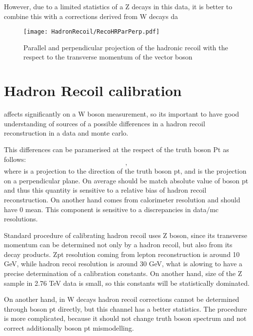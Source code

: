 However, due to a limited statistics of a Z decays in this data, it is better to combine this with a corrections derived from W decays da

\begin{figure}[t]
\begin{center}
\texttt{[image: HadronRecoil/RecoHRParPerp.pdf]}
\caption{Parallel and perpendicular projection of the hadronic recoil with the respect to the transverse momentum of the vector boson \label{ris:HadrRecoilTruthPt}}
\end{center}
\end{figure}

\section{Hadron Recoil calibration}
\etmiss affects significantly on a W boson measurement, so its important to have good understanding of sources of a possible differences in a hadron recoil reconstruction in a data and monte carlo. 

This differences can be paramerised at the respect of the truth boson Pt as follows:
\begin{equation}
,
\end{equation}
where \upar is a projection to the direction of the truth boson pt, and \uperp is the projection on a perpendicular plane. On average \upar should be match absolute value of boson pt and thus this quantity is sensitive to a relative bias of hadron recoil reconstruction. On another hand \uperp comes from calorimeter resolution and should have 0 mean. This component is sensitive to a discrepancies in data/mc resolutions.
 
Standard procedure of calibrating hadron recoil uses Z boson, since its transverse momentum can be determined not only by a hadron recoil, but also from its decay products.  Zpt resolution coming from lepton reconstruction is around 10 GeV, while hadron recoi resolution is around 30 GeV, what is alowing to have a precise determination of a calibration constants. On another hand, size of the Z sample in 2.76 TeV data is small, so this constants will be statistically dominated.

On another hand, in W decays hadron recoil corrections cannot be determined through boson pt directly, but this channel has a better statistics.  The  procedure is more complicated, because it should not change truth boson spectrum and not correct additionally boson pt mismodelling.

